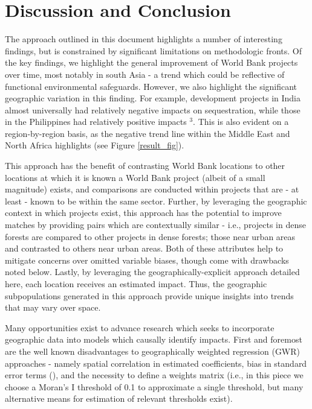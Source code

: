 \documentclass{article}\usepackage[]{graphicx}\usepackage[]{color}
\newenvironment{knitrout}{}{}  %
\begin{document}
\begin{knitrout}
\section{Discussion and Conclusion}
The approach outlined in this document highlights a number of interesting findings, but is constrained by significant limitations on methodologic fronts.
Of the key findings, we highlight the general improvement of World Bank projects over time, most notably in south Asia - a trend which could be reflective of functional environmental safeguards.  
However, we also highlight the significant geographic variation in this finding.  For example, development projects in India almost universally had relatively negative impacts on sequestration, while those in the Philippines had relatively positive impacts \begin{math}^{3}\end{math}.  
This is also evident on a region-by-region basis, as the negative trend line within the Middle East and North Africa highlights (see Figure \ref{result_fig}).  
\par
This approach has the benefit of contrasting World Bank locations to other locations at which it is known a World Bank project (albeit of a small magnitude) exists, and comparisons are conducted within projects that are - at least - known to be within the same sector. 
Further, by leveraging the geographic context in which projects exist, this approach has the potential to improve matches by providing pairs which are contextually similar - i.e., projects in dense forests are compared to other projects in dense forests; those near urban areas and contrasted to others near urban areas.
Both of these attributes help to mitigate concerns over omitted variable biases, though come with drawbacks noted below.
Lastly, by leveraging the geographically-explicit approach detailed here, each location receives an estimated impact.
Thus, the geographic subpopulations generated in this approach provide unique insights into trends that may vary over space.
\par
Many opportunities exist to advance research which seeks to incorporate geographic data into models which causally identify impacts.
First and foremost are the well known disadvantages to geographically weighted regression (GWR) approaches - namely spatial correlation in estimated coefficients, bias in standard error terms (\cite{wheeler_multicollinearity_2005}), and the necessity to define a weights matrix (i.e., in this piece we choose a Moran's I threshold of 0.1 to approximate a single threshold, but many alternative means for estimation of relevant thresholds exist).  

\end{knitrout}
\end{document}
